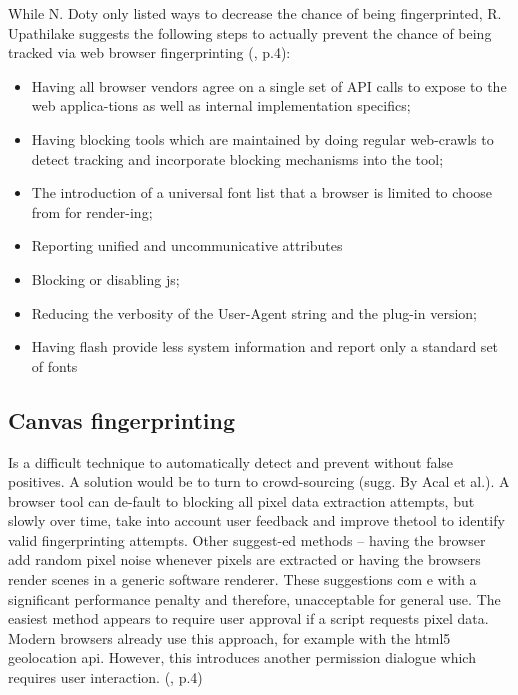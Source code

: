 While N. Doty only listed ways to decrease the chance of being fingerprinted, R. Upathilake suggests the following steps to actually prevent the chance of being tracked via web browser fingerprinting (\textcite{upi15}, p.4):
\begin{itemize}
	\item Having all browser vendors agree on a single set of API calls to expose to the web applica-tions as well as internal implementation specifics;
	\item Having blocking tools which are maintained by doing regular web-crawls to detect tracking and incorporate blocking mechanisms into the tool;
	\item The introduction of a universal font list that a browser is limited to choose from for render-ing;
	\item Reporting unified and uncommunicative attributes
	\item Blocking or disabling js;
	\item Reducing the verbosity of the User-Agent string and the plug-in version;
	\item 	Having flash provide less system information and report only a standard set of fonts \\
\end{itemize}

\subsection{Canvas fingerprinting}
Is a difficult technique to automatically detect and prevent without false positives. A solution would be to turn to crowd-sourcing (sugg. By Acal et al.). A browser tool can de-fault to blocking all pixel data extraction attempts, but slowly over time, take into account user feedback and improve thetool to identify valid fingerprinting attempts. Other suggest-ed methods – having the browser add random pixel noise whenever pixels are extracted or having the browsers render scenes in a generic software renderer. These suggestions com e with a significant performance penalty and therefore, unacceptable for general use. The easiest method appears to require user approval if a script requests pixel data. Modern browsers already use this approach, for example with the html5 geolocation api. However, this introduces another permission dialogue which requires user interaction.
(\textcite{upi15}, p.4)

